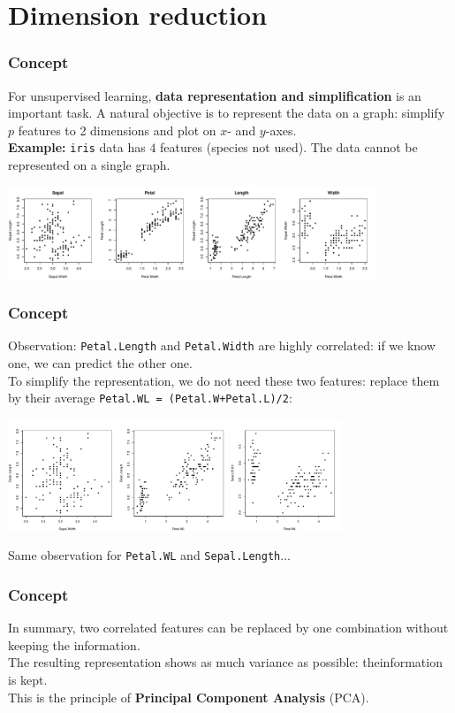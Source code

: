 \section{Dimension reduction}
\begin{frame}
\frametitle{Concept}
For unsupervised learning, {\bf data representation and simplification} is an important task. A natural objective is to represent the data on a graph: simplify $p$ features to 2 dimensions and plot on $x$- and $y$-axes. \\
\vspace{0.2cm}
{\bf Example:} {\tt iris} data has $4$ features (species not used). The data cannot be represented on a single graph.
\begin{center}
\includegraphics[width=11cm]{../../Graphs/Iris_raw.pdf}
\end{center} 
\end{frame}
\begin{frame}
\frametitle{Concept}
Observation: {\tt Petal.Length} and {\tt Petal.Width} are highly correlated: if we know one, we can predict the other one.\\
\vspace{0.3cm}
To simplify the representation, we do not need these two features: replace them by their average {\tt Petal.WL = (Petal.W+Petal.L)/2}:
\begin{center}
\includegraphics[width=10cm]{../../Graphs/Iris_raw2.pdf}
\end{center} 
Same observation for {\tt Petal.WL} and {\tt Sepal.Length}...
\end{frame}
\begin{frame}
\frametitle{Concept}
In summary, two correlated features can be replaced by one combination without keeping the information. \\
\vspace{0.3cm}
The resulting representation shows as much variance as possible: theinformation is kept.\\
\vspace{0.3cm}
This is the principle of {\bf Principal Component Analysis} (PCA).
\end{frame}
